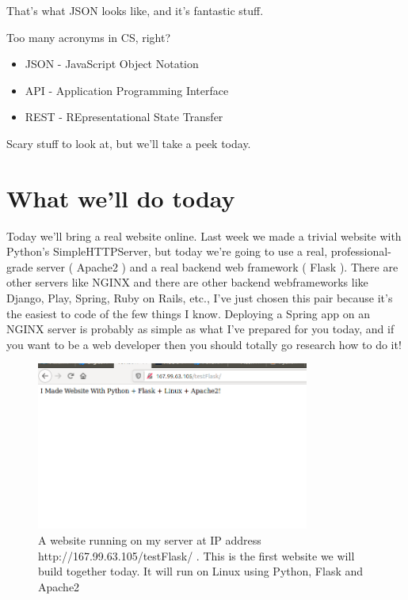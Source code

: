 \documentclass[10pt]{article}
\begin{document}
That's what JSON looks like, and it's fantastic stuff.

Too many acronyms in CS, right?

\begin{itemize}
\item JSON - JavaScript Object Notation
\item API - Application Programming Interface
\item REST - REpresentational State Transfer
\end{itemize}

Scary stuff to look at, but we'll take a peek today.

\section{What we'll do today}
Today we'll bring a real website online. Last week we made a trivial website
with Python's SimpleHTTPServer, but today we're going to use a real,
professional-grade server ( Apache2 ) and a real backend web framework ( Flask
). There are other servers like NGINX and there are other backend webframeworks
like Django, Play, Spring, Ruby on Rails, etc., I've just chosen this pair
because it's the easiest to code of the few things I know. Deploying a Spring
app on an NGINX server is probably as simple as what I've prepared for you
today, and if you want to be a web developer then you should totally go research
how to do it!

\begin{figure}[h]
  \centering
    \includegraphics[width=0.8\textwidth]{Exercise1Success.png}
  \caption{A website running on my server at IP address
http://167.99.63.105/testFlask/ . This is the first website we will build
together today. It will run on Linux using Python, Flask and Apache2}
\label{fig:firstsite}
\end{figure}
\end{document}
